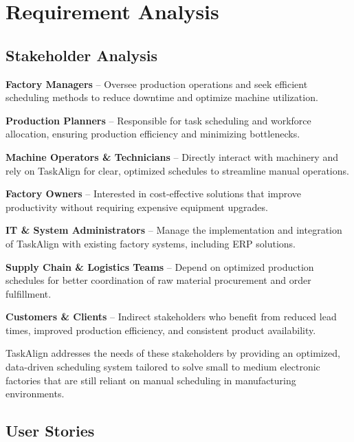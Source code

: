 \chapter{Requirement Analysis}
\label{chap:requirement-analysis}

\section{Stakeholder Analysis}
\label{section:stakeholder-analysis}


\textbf{Factory Managers} – Oversee production operations and seek efficient scheduling methods to reduce downtime and optimize machine utilization.

\textbf{Production Planners} – Responsible for task scheduling and workforce allocation, ensuring production efficiency and minimizing bottlenecks.

\textbf{Machine Operators \& Technicians} – Directly interact with machinery and rely on TaskAlign for clear, optimized schedules to streamline manual operations.

\textbf{Factory Owners} – Interested in cost-effective solutions that improve productivity without requiring expensive equipment upgrades.

\textbf{IT \& System Administrators} – Manage the implementation and integration of TaskAlign with existing factory systems, including ERP solutions.

\textbf{Supply Chain \& Logistics Teams} – Depend on optimized production schedules for better coordination of raw material procurement and order fulfillment.

\textbf{Customers \& Clients} – Indirect stakeholders who benefit from reduced lead times, improved production efficiency, and consistent product availability.

TaskAlign addresses the needs of these stakeholders by providing an optimized, data-driven scheduling system tailored to solve small to medium electronic factories that are still reliant on manual scheduling in manufacturing environments.


\section{User Stories}
\label{section:user-stories}

